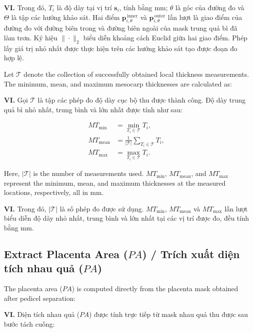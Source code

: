 \documentclass[final,1p,11pt,longtitle]{elsarticle}
\newenvironment{viet}{\par\smallskip\begingroup\color{viColor}\noindent\textbf{VI. }\ignorespaces}{\par\endgroup\smallskip}
\begin{document}
\begin{viet}
Trong đó, $T_i$ là độ dày tại vị trí $\mathbf{s}_i$, tính bằng mm; $\theta$ là góc của đường đo và $\Theta$ là tập các hướng khảo sát. Hai điểm $\mathbf{p}^{\,\mathrm{inner}}_{i,\theta}$ và $\mathbf{p}^{\,\mathrm{outer}}_{i,\theta}$ lần lượt là giao điểm của đường đo với đường biên trong và đường biên ngoài của mask trung quả bì đã làm trơn. Ký hiệu $\|\cdot\|_2$ biểu diễn khoảng cách Euclid giữa hai giao điểm. Phép lấy giá trị nhỏ nhất được thực hiện trên các hướng khảo sát tạo được đoạn đo hợp lệ.
\end{viet}

Let $\mathcal{T}$ denote the collection of successfully obtained local thickness measurements. The minimum, mean, and maximum mesocarp thicknesses are calculated as:

\begin{viet}
Gọi $\mathcal{T}$ là tập các phép đo độ dày cục bộ thu được thành công. Độ dày trung quả bì nhỏ nhất, trung bình và lớn nhất được tính như sau:
\end{viet}

\begin{align}
MT_{\min} &= \min_{T_i\in\mathcal{T}}T_i,\\
MT_{\mathrm{mean}} &= \frac{1}{|\mathcal{T}|}\sum_{T_i\in\mathcal{T}}T_i,\\
MT_{\max} &= \max_{T_i\in\mathcal{T}}T_i.
\end{align}

Here, $|\mathcal{T}|$ is the number of measurements used. $MT_{\min}$, $MT_{\mathrm{mean}}$, and $MT_{\max}$ represent the minimum, mean, and maximum thicknesses at the measured locations, respectively, all in mm.

\begin{viet}
Trong đó, $|\mathcal{T}|$ là số phép đo được sử dụng. $MT_{\min}$, $MT_{\mathrm{mean}}$ và $MT_{\max}$ lần lượt biểu diễn độ dày nhỏ nhất, trung bình và lớn nhất tại các vị trí được đo, đều tính bằng mm.
\end{viet}

\subsection*{Extract Placenta Area ($PA$) / {\color{viColor} Trích xuất diện tích nhau quả ($PA$)}}
The placenta area ($PA$) is computed directly from the placenta mask obtained after pedicel separation:

\begin{viet}
Diện tích nhau quả ($PA$) được tính trực tiếp từ mask nhau quả thu được sau bước tách cuống:
\end{viet}
\end{document}

